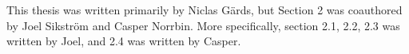 
This thesis was written primarily by Niclas Gärds, but Section 2 was coauthored by Joel Sikström and Casper Norrbin. More specifically, section 2.1, 2.2, 2.3 was written by Joel, and 2.4 was written by Casper.


